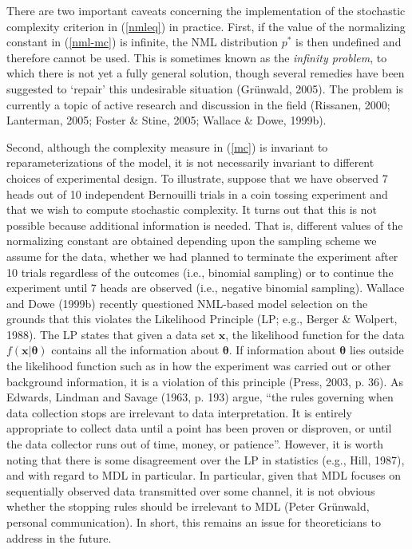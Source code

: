 \documentclass{elsart}
\begin{document}
There are two important caveats concerning the implementation of the stochastic complexity
criterion in (\ref{nmleq}) in practice. First, if the value of the normalizing constant in
(\ref{nml-mc}) is infinite, the NML distribution $p^*$ is then undefined and therefore cannot be
used. This is sometimes known as the {\it infinity problem}, to which there is not yet a fully
general solution, though several remedies have been suggested to `repair' this undesirable
situation (Gr\"{u}nwald, 2005). The problem is currently a topic of active research and discussion
in the field (Rissanen, 2000; Lanterman, 2005; Foster \& Stine, 2005; Wallace \& Dowe, 1999b).

Second, although the complexity measure in (\ref{mc}) is invariant to reparameterizations of the
model, it is not necessarily invariant to different choices of experimental design. To illustrate,
suppose that we have observed 7 heads out of 10 independent Bernouilli trials in a coin tossing
experiment and that we wish to compute stochastic complexity. It turns out that this is not
possible because additional information is needed. That is, different values of the normalizing
constant are obtained depending upon the sampling scheme we assume for the data, whether we had
planned to terminate the experiment after 10 trials regardless of the outcomes (i.e., binomial
sampling) or to continue the experiment until 7 heads are observed (i.e., negative binomial
sampling). Wallace and Dowe (1999b) recently questioned NML-based model selection on the grounds
that this violates the Likelihood Principle (LP; e.g., Berger \& Wolpert, 1988). The LP states
that given a data set $\bm x$, the likelihood function for the data $ f(\bm x| \bm \theta)$
contains all the information about $\bm\theta$. If information about $\bm\theta$ lies outside the
likelihood function such as in how the experiment was carried out or other background information,
it is a violation of this principle (Press, 2003, p. 36). As Edwards, Lindman and Savage (1963, p.
193) argue, ``the rules governing when data collection stops are irrelevant to data
interpretation. It is entirely appropriate to collect data until a point has been proven or
disproven, or until the data collector runs out of time, money, or patience''. However, it is
worth noting that there is some disagreement over the LP in statistics (e.g., Hill, 1987), and
with regard to MDL in particular. In particular, given that MDL focuses on sequentially observed
data transmitted over some channel, it is not obvious whether the stopping rules should be
irrelevant to MDL (Peter Gr\"{u}nwald, personal communication). In short, this remains an issue
for theoreticians to address in the future.
\end{document}
